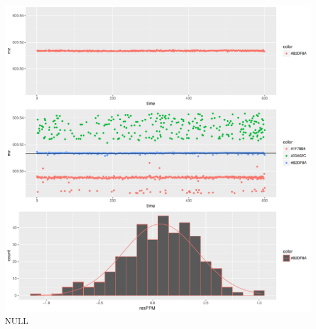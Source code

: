 \documentclass[]{article}
\begin{document}
\includegraphics{Supplementary_document_files/figure-latex/filter.lm.600-1.pdf}
NULL
\end{document}
